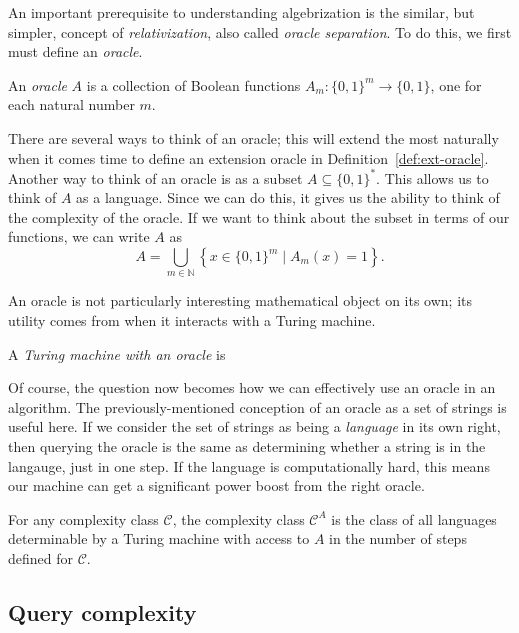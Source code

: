 An important prerequisite to understanding algebrization is the similar, but
simpler, concept of \emph{relativization}, also called \emph{oracle separation}.
To do this, we first must define an \emph{oracle}.
\begin{defn}[{\cite[Def.\ 2.1]{AW09}}]\label{def:oracle}
  An \emph{oracle} $A$ is a collection of Boolean functions
  $A_{m}: \{0, 1\}^{m} \rightarrow \{0, 1\}$, one for each natural number $m$.
\end{defn}
There are several ways to think of an oracle; this will extend the most
naturally when it comes time to define an extension oracle in
Definition~\ref{def:ext-oracle}. Another way to think of an oracle is as a
subset $A \subseteq \{0, 1\}^{*}$. This allows us to think of $A$ as a language. Since
we can do this, it gives us the ability to think of the complexity of the
oracle. If we want to think about the subset in terms of our functions, we can
write $A$ as
\begin{equation}
  A = \bigcup_{m \in \mathbb{N}}\left\{x \in \{0, 1\}^{m} \mid A_{m}(x) = 1\right\}.
\end{equation}

An oracle is not particularly interesting mathematical object on its own; its
utility comes from when it interacts with a Turing machine.
\begin{defn}\label{def:tm-oracle}
  A \emph{Turing machine with an oracle} is %
\end{defn}
Of course, the question now becomes how we can effectively use an oracle in an
algorithm. The previously-mentioned conception of an oracle as a set of strings
is useful here. If we consider the set of strings as being a \emph{language} in
its own right, then querying the oracle is the same as determining whether a
string is in the langauge, just in one step. If the language is computationally
hard, this means our machine can get a significant power boost from the right
oracle.
\begin{defn}[{\cite[Def.\ 2.1]{AW09}}]\label{def:oracle-class}
  For any complexity class $\mathcal{C}$, the complexity class $\mathcal{C}^{A}$ is the class of all
  languages determinable by a Turing machine with access to $A$ in the number of
  steps defined for $\mathcal{C}$.
\end{defn}


\subsection{Query complexity}\label{sec:query-complexity}

